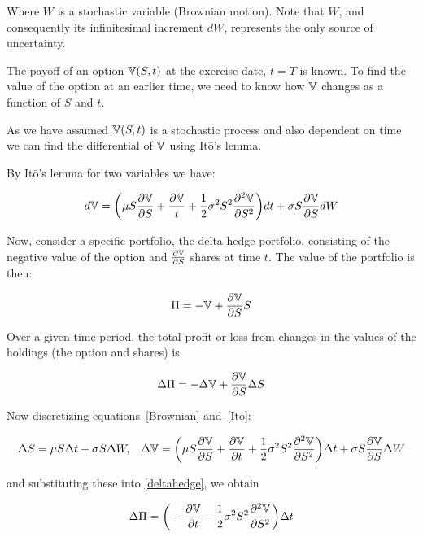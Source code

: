 Where \(W\) is a stochastic variable (Brownian motion). Note that \(W \), and consequently its infinitesimal increment \(dW \), represents the only source of uncertainty.

The payoff of an option \(\mathbb{V}(S,t) \) at the exercise date, \(t = T\) is known. To find the value of the option at an earlier time, we need to know how \(\mathbb{V} \) changes as a function of \(S \) and \(t \).

As we have assumed \(\mathbb{V}(S,t) \) is a stochastic process and also dependent on time we can find the differential of \(\mathbb{V} \) using Itō's lemma. 

By Itō's lemma for two variables we have:

\begin{equation}\label{Ito}
    d\mathbb{V} = \bigg( \mu S \frac{\partial \mathbb{V}}{\partial S} + \frac{\partial \mathbb{V}}{t} + \frac{1}{2}\sigma^2 S^2 \frac{\partial^2 \mathbb{V}}{\partial S^2}\bigg)dt + \sigma S \frac{\partial \mathbb{V}}{\partial S}dW
\end{equation}

Now, consider a specific portfolio, the delta-hedge portfolio, consisting of the negative value of the option and \(\frac{\partial \mathbb{V}}{\partial S} \) shares at time \(t \). The value of the portfolio is then:

\begin{equation*}
    \Pi = -\mathbb{V} + \frac{\partial \mathbb{V}}{\partial S}S
\end{equation*}

Over a given time period, the total profit or loss from changes in the values of the holdings (the option and shares) is

\begin{equation}\label{deltahedge}
    \Delta \Pi = -\Delta \mathbb{V} + \frac{\partial \mathbb{V}}{\partial S}\Delta S
\end{equation}

Now discretizing equations~\eqref{Brownian} and~\eqref{Ito}:

\begin{align*}
    \Delta S &= \mu S \Delta t + \sigma S \Delta W , & \Delta \mathbb{V} = \bigg(\mu S \frac{\partial \mathbb{V}}{\partial S} + \frac{\partial \mathbb{V}}{\partial t} + \frac{1}{2}\sigma^2S^2\frac{\partial^2\mathbb{V}}{\partial S^2}\bigg)\Delta t + \sigma S \frac{\partial \mathbb{V}}{\partial S} \Delta W
\end{align*}

and substituting these into \autoref{deltahedge}, we obtain

\begin{equation}\label{LHS}
    \Delta \Pi = \bigg(-\frac{\partial \mathbb{V}}{\partial t} - \frac{1}{2}\sigma^2S^2\frac{\partial^2\mathbb{V}}{\partial S^2}\bigg)\Delta t
\end{equation}

